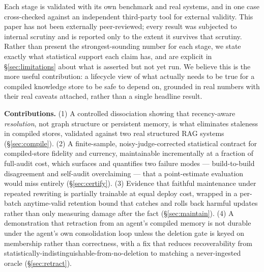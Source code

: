 Each stage is validated with its own benchmark and real systems, and in one case cross-checked against an independent third-party tool for external validity. This paper has not been externally peer-reviewed; every result was subjected to internal scrutiny and is reported only to the extent it survives that scrutiny. Rather than present the strongest-sounding number for each stage, we state exactly what statistical support each claim has, and are explicit in \S\ref{sec:limitations} about what is asserted but not yet run. We believe this is the more useful contribution: a lifecycle view of what actually needs to be true for a compiled knowledge store to be safe to depend on, grounded in real numbers with their real caveats attached, rather than a single headline result.

\textbf{Contributions.} (1) A controlled dissociation showing that recency-aware \emph{resolution}, not graph structure or persistent memory, is what eliminates staleness in compiled stores, validated against two real structured RAG systems (\S\ref{sec:compile}). (2) A finite-sample, noisy-judge-corrected statistical contract for compiled-store fidelity and currency, maintainable incrementally at a fraction of full-audit cost, which surfaces and quantifies two failure modes --- build-to-build disagreement and self-audit overclaiming --- that a point-estimate evaluation would miss entirely (\S\ref{sec:certify}). (3) Evidence that faithful maintenance under repeated rewriting is partially trainable at equal deploy cost, wrapped in a per-batch anytime-valid retention bound that catches and rolls back harmful updates rather than only measuring damage after the fact (\S\ref{sec:maintain}). (4) A demonstration that retraction from an agent's compiled memory is not durable under the agent's own consolidation loop unless the deletion gate is keyed on membership rather than correctness, with a fix that reduces recoverability from statistically-indistinguishable-from-no-deletion to matching a never-ingested oracle (\S\ref{sec:retract}).
